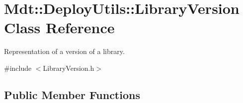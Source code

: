 \hypertarget{class_mdt_1_1_deploy_utils_1_1_library_version}{}\section{Mdt\+:\+:Deploy\+Utils\+:\+:Library\+Version Class Reference}
\label{class_mdt_1_1_deploy_utils_1_1_library_version}


Representation of a version of a library.  




{\ttfamily \#include $<$Library\+Version.\+h$>$}

\subsection*{Public Member Functions}
